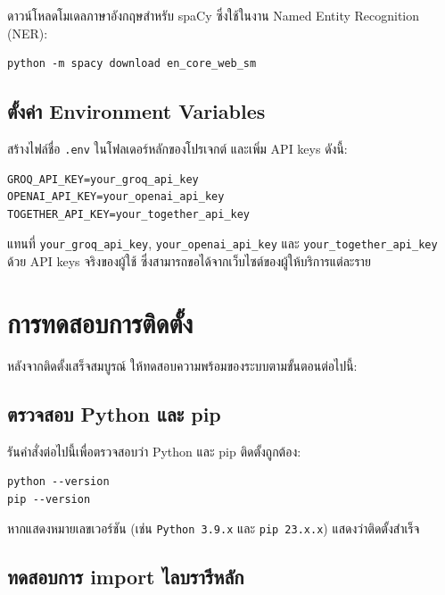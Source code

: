 ดาวน์โหลดโมเดลภาษาอังกฤษสำหรับ spaCy ซึ่งใช้ในงาน Named Entity Recognition (NER):

\begin{lstlisting}[style=bash]
python -m spacy download en_core_web_sm
\end{lstlisting}

\subsection{ตั้งค่า Environment Variables}
\label{subsec:env-vars}

สร้างไฟล์ชื่อ \texttt{.env} ในโฟลเดอร์หลักของโปรเจกต์ และเพิ่ม API keys ดังนี้:

\begin{lstlisting}[style=env]
GROQ_API_KEY=your_groq_api_key
OPENAI_API_KEY=your_openai_api_key
TOGETHER_API_KEY=your_together_api_key
\end{lstlisting}

\noindent แทนที่ \texttt{your\_groq\_api\_key}, \texttt{your\_openai\_api\_key} และ \texttt{your\_together\_api\_key} ด้วย API keys จริงของผู้ใช้ ซึ่งสามารถขอได้จากเว็บไซต์ของผู้ให้บริการแต่ละราย

\section{การทดสอบการติดตั้ง}
\label{sec:test-installation}

หลังจากติดตั้งเสร็จสมบูรณ์ ให้ทดสอบความพร้อมของระบบตามขั้นตอนต่อไปนี้:

\subsection{ตรวจสอบ Python และ pip}
\label{subsec:check-python}

รันคำสั่งต่อไปนี้เพื่อตรวจสอบว่า Python และ pip ติดตั้งถูกต้อง:

\begin{lstlisting}[style=bash]
python --version
pip --version
\end{lstlisting}

\noindent หากแสดงหมายเลขเวอร์ชัน (เช่น \texttt{Python 3.9.x} และ \texttt{pip 23.x.x}) แสดงว่าติดตั้งสำเร็จ

\subsection{ทดสอบการ import ไลบรารีหลัก}
\label{subsec:test-import}


